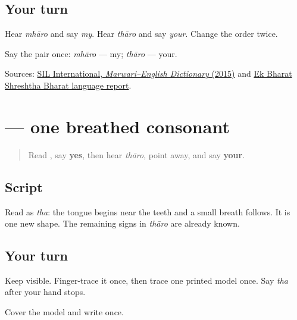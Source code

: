 \subsection*{Your turn}
Hear \emph{mhāro} and say \emph{my}. Hear \emph{thāro} and say \emph{your}. Change the order twice.

\begin{tcolorbox}[breakable,colback=teal!4,colframe=teal!35!black,title={Before you move on}]
Say the pair once: \emph{mhāro} — my; \emph{thāro} — your.

Sources: \href{https://nepal.sil.org/resources/archives/63768}{SIL International, \emph{Marwari–English Dictionary} (2015)} and \href{https://www.rgmcet.edu.in/assets/img/documents/Campus\%20Life/Other\%20Reports.pdf}{Ek Bharat Shreshtha Bharat language report}.
\end{tcolorbox}
\section[\texorpdfstring{\mw{थ} (tha)}{थ (tha)}]{ — one breathed consonant}

\label{lesson:MW-W05-tha}



\begin{quote}
Read \textbf{}, say \textbf{yes}, then hear \emph{thāro}, point away, and say \textbf{your}.
\end{quote}

\subsection*{Script}

\begin{quote}
\end{quote}

Read \textbf{} as \emph{tha}: the tongue begins near the teeth and a small breath follows. It is one new shape. The remaining signs in \emph{thāro} are already known.

\subsection*{Your turn}
Keep \textbf{} visible. Finger-trace it once, then trace one printed model once. Say \emph{tha} after your hand stops.

\begin{tcolorbox}[breakable,colback=teal!4,colframe=teal!35!black,title={Before you move on}]
Cover the model and write \textbf{} once.
\end{tcolorbox}
